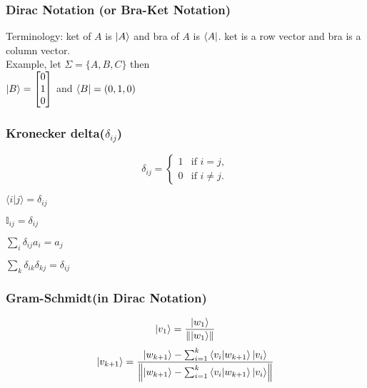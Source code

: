\documentclass[5pt]{article}
\begin{document}
\begin{multicols}{3}
\subsubsection{Dirac Notation \footnotesize{(or Bra-Ket Notation)}}
Terminology: ket of $A$ is $\ket{A}$ and bra of $A$ is $\bra{A}$. ket is a row vector and bra is a column vector.\\
Example, let $\Sigma=\{A,B,C\}$ then\\
$\ket{B}=\begin{bmatrix}0\\1\\0 \end{bmatrix}$ and $\bra{B}=(0,1,0)$\\

\subsubsection{Kronecker delta($\delta_{ij}$)}
\begin{equation*}
    \delta_{ij} =
    \begin{cases}
        1 & \text{if } i = j, \\
        0 & \text{if } i \neq j.
    \end{cases}
\end{equation*}
\begin{properties}
     \begin{itemize*}
          \item $\langle i|j\rangle=\delta_{ij}$
          \item $\mathbb{I}_{ij}=\delta_{ij}$
          \item $\sum_i\delta_{ij}a_i=a_j$ 
          \item $\sum_k\delta_{ik}\delta_{kj}=\delta_{ij}$ 
     \end{itemize*}
\end{properties}

\subsubsection{Gram-Schmidt\footnotesize{(in Dirac Notation)}}
\begin{equation*}
     \ket{v_1}=\frac{\ket{w_1}}{\norm{\ket{w_1}}}\\
\end{equation*}
\begin{equation*}
     \ket{v_{k+1}}=\frac{\ket{w_{k+1}}-\sum_{i=1}^k\braket{v_i}{w_{k+1}}\ket{v_i}}{\norm{\ket{w_{k+1}}-\sum_{i=1}^k\braket{v_i}{w_{k+1}}\ket{v_i}}}
\end{equation*}


\end{multicols}
\end{document}
